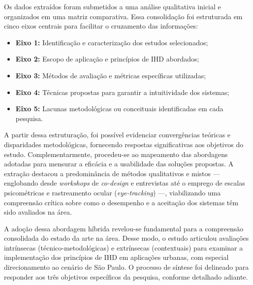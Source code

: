 \documentclass[
	12pt,				%
	oneside,			%
	a4paper,			%
	english,			%
	brazil				%
	]{abntex2ppgsi}
\begin{document}
    Os dados extraídos foram submetidos a uma análise qualitativa inicial e organizados em uma matriz comparativa. Essa consolidação foi estruturada em cinco eixos centrais para facilitar o cruzamento das informações:

\begin{itemize}
    \item[] \textbf{Eixo 1:} Identificação e caracterização dos estudos selecionados;
    \item[] \textbf{Eixo 2:} Escopo de aplicação e princípios de IHD abordados;
    \item[] \textbf{Eixo 3:} Métodos de avaliação e métricas específicas utilizadas;
    \item[] \textbf{Eixo 4:} Técnicas propostas para garantir a intuitividade dos sistemas;
    \item[] \textbf{Eixo 5:} Lacunas metodológicas ou conceituais identificadas em cada pesquisa.
\end{itemize}

    A partir dessa estruturação, foi possível evidenciar convergências teóricas e disparidades metodológicas, fornecendo respostas significativas aos objetivos do estudo. Complementarmente, procedeu-se ao mapeamento das abordagens adotadas para mensurar a eficácia e a usabilidade das soluções propostas. A extração destacou a predominância de métodos qualitativos e mistos --- englobando desde \textit{workshops} de \textit{co-design} e entrevistas até o emprego de escalas psicométricas e rastreamento ocular (\textit{eye-tracking}) ---, viabilizando uma compreensão crítica sobre como o desempenho e a aceitação dos sistemas têm sido avaliados na área.

    A adoção dessa abordagem híbrida revelou-se fundamental para a compreensão consolidada do estado da arte na área. Desse modo, o estudo articulou avaliações intrínsecas (técnico-metodológicas) e extrínsecas (contextuais) para examinar a implementação dos princípios de IHD em aplicações urbanas, com especial direcionamento ao cenário de São Paulo. O processo de síntese foi delineado para responder aos três objetivos específicos da pesquisa, conforme detalhado adiante.


    
\end{document}
